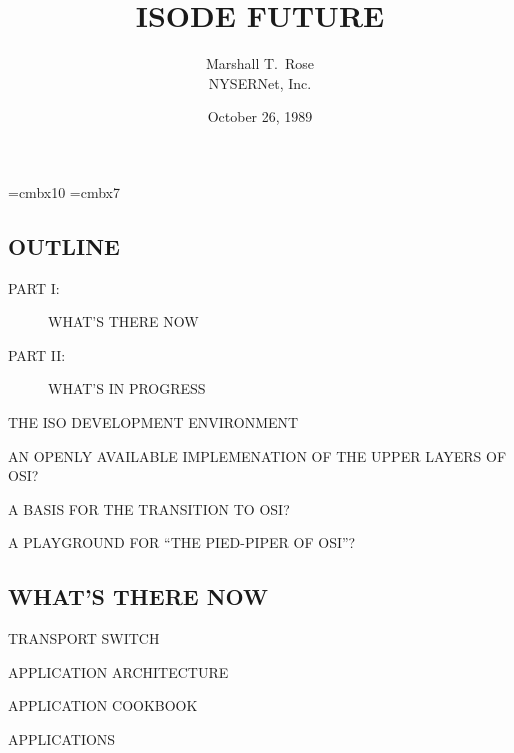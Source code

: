 

\font\xx=cmbx10
\font\yy=cmbx7

\raggedright


\let\tradeNAMfont=\relax
\let\tradeORGfont=\relax



\title	{ISODE FUTURE}
\author	{Marshall T.~Rose\\ NYSERNet, Inc.}
\date	{October 26, 1989}
\maketitlepage


\begin{bwslide}
\part*	{OUTLINE}\bf

\begin{description}
\item[PART I:]		WHAT'S THERE NOW

\item[PART II:]		WHAT'S IN PROGRESS
\end{description}
\end{bwslide}


\begin{bwslide}

\begin{nrtc}
\item	THE ISO DEVELOPMENT ENVIRONMENT

\item	AN OPENLY AVAILABLE IMPLEMENATION OF THE UPPER LAYERS OF OSI?

\item	A BASIS FOR THE TRANSITION TO OSI?

\item	A PLAYGROUND FOR ``THE PIED-PIPER OF OSI''?
\end{nrtc}
\end{bwslide}


\begin{bwslide}
\part	{WHAT'S THERE NOW}\bf

\begin{nrtc}
\item	TRANSPORT SWITCH

\item	APPLICATION ARCHITECTURE

\item	APPLICATION COOKBOOK

\item	APPLICATIONS
\end{nrtc}
\end{bwslide}


